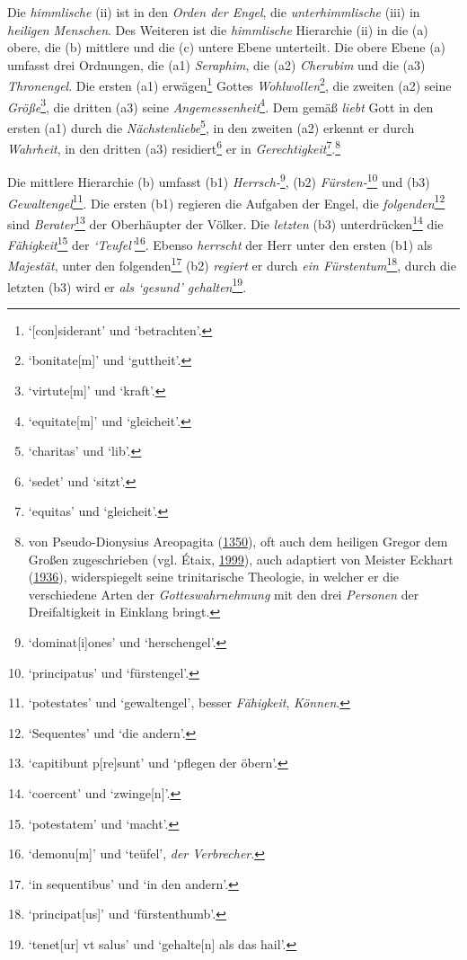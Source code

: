 \documentclass[
]{article}
\begin{document}
Die \emph{himmlische} (ii) ist in den \emph{Orden der Engel}, die
\emph{unterhimmlische} (iii) in \emph{heiligen Menschen}. Des Weiteren
ist die \emph{himmlische} Hierarchie (ii) in die (a) obere, die (b)
mittlere und die (c) untere Ebene unterteilt. Die obere Ebene (a)
umfasst drei Ordnungen, die (a1) \emph{Seraphim}, die (a2)
\emph{Cherubim} und die (a3) \emph{Thronengel}. Die ersten (a1)
erwägen\footnote{`{[}con{]}siderant' und `betrachten'.} Gottes
\emph{Wohlwollen}\footnote{`bonitate{[}m{]}' und `guttheit'.}, die
zweiten (a2) seine \emph{Größe}\footnote{`virtute{[}m{]}' und `kraft'.},
die dritten (a3) seine \emph{Angemessenheit}\footnote{`equitate{[}m{]}'
  und `gleicheit'.}. Dem gemäß \emph{liebt} Gott in den ersten (a1)
durch die \emph{Nächstenliebe}\footnote{`charitas' und `lib'.}, in den
zweiten (a2) erkennt er durch \emph{Wahrheit}, in den dritten (a3)
residiert\footnote{`sedet' und `sitzt'.} er in
\emph{Gerechtigkeit}\footnote{`equitas' und `gleicheit'.}.\footnote{von
  Pseudo-Dionysius Areopagita
  (\href{https://digital.bodleian.ox.ac.uk/objects/ee19a692-5066-4c84-95db-d93c4fc82b97/}{1350}),
  oft auch dem heiligen Gregor dem Großen zugeschrieben (vgl. Étaix,
  \href{https://books.google.com/books?id=r4ERnwEACAAJ}{1999}), auch
  adaptiert von Meister Eckhart
  (\href{http://www.eckhart.de/opus.htm}{1936}), widerspiegelt seine
  trinitarische Theologie, in welcher er die verschiedene Arten der
  \emph{Gotteswahrnehmung} mit den drei \emph{Personen} der
  Dreifaltigkeit in Einklang bringt.}

Die mittlere Hierarchie (b) umfasst (b1) \emph{Herrsch-}\footnote{`dominat{[}i{]}ones'
  und `herschengel'.}, (b2) \emph{Fürsten-}\footnote{`principatus' und
  `fürstengel'.} und (b3) \emph{Gewaltengel}\footnote{`potestates' und
  `gewaltengel', besser \emph{Fähigkeit}, \emph{Können}.}. Die ersten
(b1) regieren die Aufgaben der Engel, die \emph{folgenden}\footnote{`Sequentes'
  und `die andern'.} sind \emph{Berater}\footnote{`capitibunt
  p{[}re{]}sunt' und `pflegen der öbern'.} der Oberhäupter der Völker.
Die \emph{letzten} (b3) unterdrücken\footnote{`coercent' und
  `zwinge{[}n{]}'.} die \emph{Fähigkeit}\footnote{`potestatem' und
  `macht'.} der \emph{`Teufel'}\footnote{`demonu{[}m{]}' und `teüfel',
  \emph{der Verbrecher}.}. Ebenso \emph{herrscht} der Herr unter den
ersten (b1) als \emph{Majestät}, unter den folgenden\footnote{`in
  sequentibus' und `in den andern'.} (b2) \emph{regiert} er durch
\emph{ein Fürstentum}\footnote{`principat{[}us{]}' und `fürstenthumb'.},
durch die letzten (b3) wird er \emph{als `gesund' gehalten}\footnote{`tenet{[}ur{]}
  vt salus' und `gehalte{[}n{]} als das hail'.}.
\end{document}
